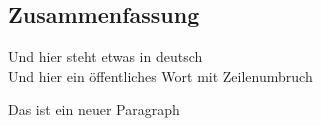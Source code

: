
\begin{otherlanguage}{german}

\chapter*{Zusammenfassung}

Und hier steht etwas in deutsch\\
Und hier ein \"offentliches Wort mit Zeilenumbruch

Das ist ein neuer Paragraph

\lipsum*[1-2]

\end{otherlanguage}

